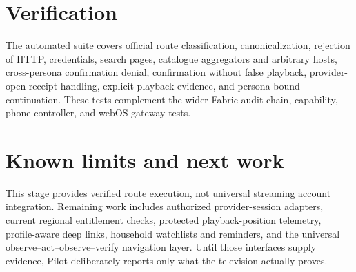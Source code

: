 \documentclass[11pt,a4paper]{article}
\begin{document}
\section{Verification}

The automated suite covers official route classification, canonicalization,
rejection of HTTP, credentials, search pages, catalogue aggregators and arbitrary
hosts, cross-persona confirmation denial, confirmation without false playback,
provider-open receipt handling, explicit playback evidence, and persona-bound
continuation.  These tests complement the wider Fabric audit-chain, capability,
phone-controller, and webOS gateway tests.

\section{Known limits and next work}

This stage provides verified route execution, not universal streaming account
integration.  Remaining work includes authorized provider-session adapters,
current regional entitlement checks, protected playback-position telemetry,
profile-aware deep links, household watchlists and reminders, and the universal
observe--act--observe--verify navigation layer.  Until those interfaces supply
evidence, Pilot deliberately reports only what the television actually proves.
\end{document}
